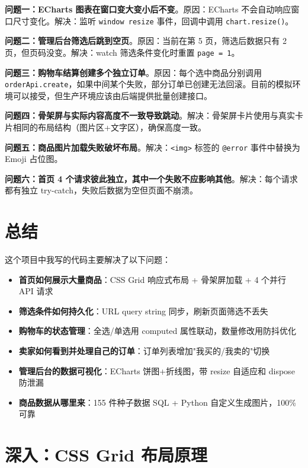 \documentclass[12pt,a4paper]{ctexart}
\begin{document}
\textbf{问题一：ECharts 图表在窗口变大变小后不变}。原因：ECharts 不会自动响应窗口尺寸变化。解决：监听 \texttt{window resize} 事件，回调中调用 \texttt{chart.resize()}。

\textbf{问题二：管理后台筛选后跳到空页}。原因：当前在第 5 页，筛选后数据只有 2 页，但页码没变。解决：watch 筛选条件变化时重置 \texttt{page = 1}。

\textbf{问题三：购物车结算创建多个独立订单}。原因：每个选中商品分别调用 \texttt{orderApi.create}，如果中间某个失败，部分订单已创建无法回滚。目前的模拟环境可以接受，但生产环境应该由后端提供批量创建接口。

\textbf{问题四：骨架屏与实际内容高度不一致导致跳动}。解决：骨架屏卡片使用与真实卡片相同的布局结构（图片区+文字区），确保高度一致。

\textbf{问题五：商品图片加载失败破坏布局}。解决：\texttt{<img>} 标签的 \texttt{@error} 事件中替换为 Emoji 占位图。

\textbf{问题六：首页 4 个请求彼此独立，其中一个失败不应影响其他}。解决：每个请求都有独立 try-catch，失败后数据为空但页面不崩溃。

\section{总结}

这个项目中我写的代码主要解决了以下问题：

\begin{itemize}
  \item \textbf{首页如何展示大量商品}：CSS Grid 响应式布局 + 骨架屏加载 + 4 个并行 API 请求
  \item \textbf{筛选条件如何持久化}：URL query string 同步，刷新页面筛选不丢失
  \item \textbf{购物车的状态管理}：全选/单选用 computed 属性联动，数量修改用防抖优化
  \item \textbf{卖家如何看到并处理自己的订单}：订单列表增加"我买的/我卖的"切换
  \item \textbf{管理后台的数据可视化}：ECharts 饼图+折线图，带 resize 自适应和 dispose 防泄漏
  \item \textbf{商品数据从哪里来}：155 件种子数据 SQL + Python 自定义生成图片，100\% 可靠
\end{itemize}

\section{深入：CSS Grid 布局原理}
\end{document}
